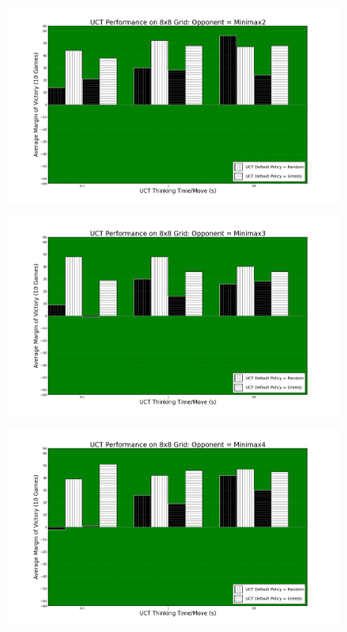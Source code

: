 \documentclass[12pt,letterpaper]{article}
\begin{document}
\begin{figure}[!hp]
\begin{center}
\includegraphics[scale=.4]{88_Minimax2}
\end{center}
\end{figure}

\begin{figure}[!hp]
\begin{center}
\includegraphics[scale=.4]{88_Minimax3}
\end{center}
\end{figure}

\begin{figure}[!hp]
\begin{center}
\includegraphics[scale=.4]{88_Minimax4}
\end{center}
\end{figure}
\end{document}
